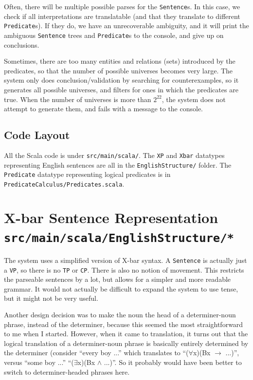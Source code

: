 \documentclass[a4paper, 11pt]{article}
\begin{document}
Often, there will be multiple possible parses for the \texttt{Sentence}s.
In this case, we check if all interpretations are translatable (and that they translate to different \texttt{Predicate}s).
If they do, we have an unrecoverable ambiguity, and it will print the ambiguous \texttt{Sentence} trees and \texttt{Predicate}s to the console, and give up on conclusions.

Sometimes, there are too many entities and relations (sets) introduced by the predicates, so that the number of possible universes becomes very large. The system only does conclusion/validation by searching for counterexamples, so it generates all possible universes, and filters for ones in which the predicates are true. When the number of universes is more than $2^{22}$, the system does not attempt to generate them, and fails with a message to the console.

\subsection{Code Layout}
All the Scala code is under \texttt{src/main/scala/}.
The \texttt{XP} and \texttt{Xbar} datatypes representing English sentences are all in the \texttt{EnglishStructure/} folder.
The \texttt{Predicate} datatype representing logical predicates is in \texttt{PredicateCalculus/Predicates.scala}.


\section[X-bar Sentence Representation]{X-bar Sentence Representation\\
	\normalsize \texttt{src/main/scala/EnglishStructure/*}}
The system uses a simplified version of X-bar syntax. A \texttt{Sentence} is actually just a \texttt{VP}, so there is no \texttt{TP} or \texttt{CP}. There is also no notion of movement. This restricts the parseable sentences by a lot, but allows for a simpler and more readable grammar. It would not actually be difficult to expand the system to use tense, but it might not be very useful.

Another design decision was to make the noun the head of a determiner-noun phrase, instead of the determiner, because this seemed the most straightforward to me when I started. However, when it came to translation, it turns out that the logical translation of a determiner-noun phrase is basically entirely determined by the determiner (consider ``every boy ...'' which translates to ``($\forall$x)(Bx $\rightarrow$ ...)'', versus ``some boy ...'' ``($\exists$x)(Bx $\wedge$ ...)''. So it probably would have been better to switch to determiner-headed phrases here.
\end{document}
